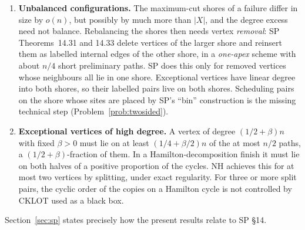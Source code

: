 \documentclass[11pt]{article}
\theoremstyle{definition}
\begin{document}
\begin{enumerate}[label=(R\arabic*)]
\item \textbf{Unbalanced configurations.} The maximum-cut shores of a failure differ in size by $o(n)$, but possibly by much more than $|X|$, and the degree excess need not balance. Rebalancing the shores then needs vertex \emph{removal}: SP Theorems~14.31 and 14.33 delete vertices of the larger shore and reinsert them as labelled internal edges of the other shore, in a \emph{one-apex} scheme with about $n/4$ short preliminary paths. SP does this only for removed vertices whose neighbours all lie in one shore. Exceptional vertices have linear degree into both shores, so their labelled pairs live on both shores. Scheduling pairs on the shore whose sites are placed by SP's ``bin'' construction is the missing technical step (Problem~\ref{prob:twosided}).
\item \textbf{Exceptional vertices of high degree.} A vertex of degree $(1/2+\beta)n$ with fixed $\beta>0$ must lie on at least $(1/4+\beta/2)n$ of the at most $n/2$ paths, a $(1/2+\beta)$-fraction of them. In a Hamilton-decomposition finish it must lie on both halves of a positive proportion of the cycles. NH achieves this for at most two vertices by splitting, under exact regularity. For three or more split pairs, the cyclic order of the copies on a Hamilton cycle is not controlled by CKLOT used as a black box.
\end{enumerate}

Section~\ref{sec:sp} states precisely how the present results relate to SP \S14.
\end{document}
